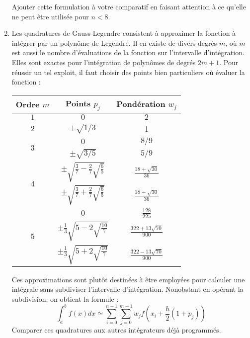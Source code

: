 \begin{enumerate}
Ajouter cette formulation à votre  comparatif en faisant attention à
ce qu'elle ne peut être utilisée pour $n<8$.
\item  Les quadratures  de Gauss-Legendre  consistent à  approximer la
  fonction à  intégrer par un  polynôme de  Legendre. Il en  existe de
  divers degrés  $m$, où $m$  est aussi  le nombre d'évaluations  de la
  fonction sur  l'intervalle d'intégration.   Elles sont  exactes pour
  l'intégration de  polynômes de  degrés $2m+1$.  Pour réussir  un tel
  exploit, il faut choisir des  points bien particuliers où évaluer la
  fonction :
\begin{center}
\begin{tabular}{ccc}
Ordre $m$& Points $p_j$ &Pondération $w_j$\\
\hline\hline
\strut$1$ & $0$ & $2$ \\\hline
\strut$2$ & $\pm \sqrt{1/3}$ & 1\\\hline
\multirow{2}{*}{$3$} &  $0$              & $8/9$\\
                     & $\pm\sqrt{3/5}$   & $5/9$\\\hline
\multirow{2}{*}{$4$} &  $\pm\sqrt{\frac{3}{7}-\frac{2}{7}\sqrt{\frac{6}{5}}}$              & $\frac{18+\sqrt{30}}{36}$\\
                     &  $\pm\sqrt{\frac{3}{7}+\frac{2}{7}\sqrt{\frac{6}{5}}}$              & $\frac{18-\sqrt{30}}{36}$\\\hline
\multirow{3}{*}{$5$} & $0$ & $\frac{128}{225}$\\
                     &  $\pm\frac{1}{3}\sqrt{5-2\sqrt{\frac{10}{7}}}$ & $\frac{322+13\sqrt{70}}{900}$\\
                     &  $\pm\frac{1}{3}\sqrt{5+2\sqrt{\frac{10}{7}}}$ & $\frac{322-13\sqrt{70}}{900}$\\

\end{tabular}
\end{center}
Ces  approximations  sont  plutôt  destinées  à  être  employées  pour
calculer     une     intégrale    sans     subdiviser     l'intervalle
d'intégration.  Nonobstant en  opérant  la subdivision,  on obtient  la
formule :
\begin{equation}
\int_a^b   f(x)dx   \simeq   \sum_{i=0}^{n-1}   \sum_{j=0}^{m-1}   w_j
f(x_i+\frac{h}{2}(1+p_j))
\end{equation}
Comparer  ces  quadratures  aux autres  intégrateurs  déjà  programmés.\\

 



\end{enumerate}
